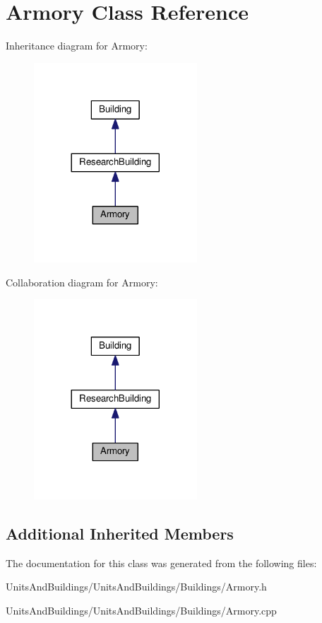 \hypertarget{class_armory}{}\section{Armory Class Reference}
\label{class_armory}


Inheritance diagram for Armory\+:
\nopagebreak
\begin{figure}[H]
\begin{center}
\leavevmode
\includegraphics[width=173pt]{class_armory__inherit__graph}
\end{center}
\end{figure}


Collaboration diagram for Armory\+:
\nopagebreak
\begin{figure}[H]
\begin{center}
\leavevmode
\includegraphics[width=173pt]{class_armory__coll__graph}
\end{center}
\end{figure}
\subsection*{Additional Inherited Members}


The documentation for this class was generated from the following files\+:\begin{DoxyCompactItemize}
\item 
Units\+And\+Buildings/\+Units\+And\+Buildings/\+Buildings/Armory.\+h\item 
Units\+And\+Buildings/\+Units\+And\+Buildings/\+Buildings/Armory.\+cpp\end{DoxyCompactItemize}

